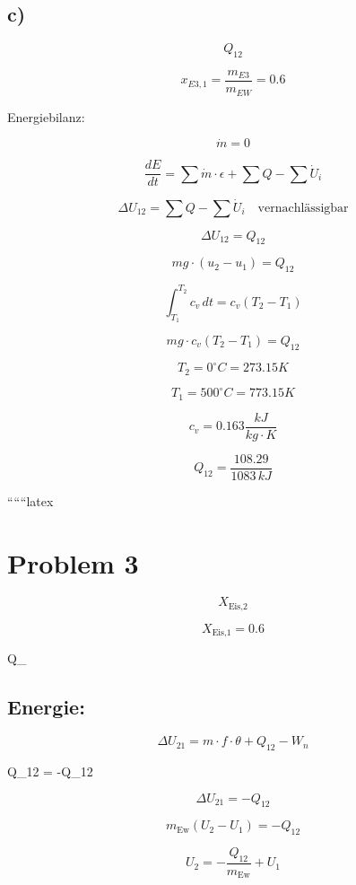 

\subsection*{c)}

\[ Q_{12} \]

\[ x_{E3,1} = \frac{m_{E3}}{m_{EW}} = 0.6 \]

Energiebilanz:

\[ \dot{m} = 0 \]

\[ \frac{dE}{dt} = \sum \dot{m} \cdot \epsilon + \sum Q - \sum \dot{U}_i \]

\[ \Delta U_{12} = \sum Q - \sum \dot{U}_i \quad \text{vernachlässigbar} \]

\[ \Delta U_{12} = Q_{12} \]

\[ mg \cdot (u_2 - u_1) = Q_{12} \]

\[ \int_{T_1}^{T_2} c_v \, dt = c_v (T_2 - T_1) \]

\[ mg \cdot c_v (T_2 - T_1) = Q_{12} \]

\[ T_2 = 0^\circ C = 273.15 K \]

\[ T_1 = 500^\circ C = 773.15 K \]

\[ c_v = 0.163 \frac{kJ}{kg \cdot K} \]

\[ Q_{12} = \frac{108.29}{1083 \, kJ} \]

``````latex


\section*{Problem 3}

\[
X_{\text{Eis,2}}
\]

\[
X_{\text{Eis,1}} = 0.6
\]

 \quad Q_{} \quad {}  \,  \quad {}

\subsection*{Energie:}

\[
\Delta U_{21} = m \cdot f \cdot \theta + Q_{12} - W_{n}
\]

 \quad Q_{12} = -Q_{12}

\[
\Delta U_{21} = -Q_{12}
\]

\[
m_{\text{Ew}} (U_2 - U_1) = -Q_{12}
\]

\[
U_2 = -\frac{Q_{12}}{m_{\text{Ew}}} + U_1
\]

